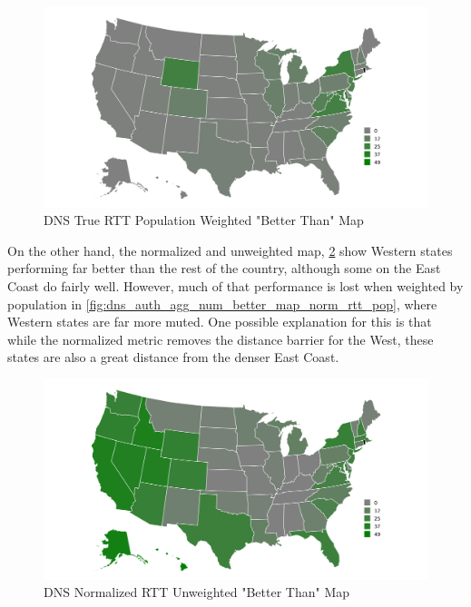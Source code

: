 \begin{figure}
    \centering
    \includegraphics{images/dns/analysis_auth_agg/rtt/population/num_better_than_map_rtt_pop.png}
    \caption{DNS True RTT Population Weighted "Better Than" Map}
    \label{fig:dns_auth_agg_num_better_map_rtt_pop}
\end{figure}

On the other hand, the normalized and unweighted map, \cref{fig:dns_auth_agg_num_better_map_norm_rtt_un} show Western states performing far better than the rest of the country, although some on the East Coast do fairly well. However, much of that performance is lost when weighted by population in \cref{fig:dns_auth_agg_num_better_map_norm_rtt_pop}, where Western states are far more muted. One possible explanation for this is that while the normalized metric removes the distance barrier for the West, these states are also a great distance from the denser East Coast.

\begin{figure}
    \centering
    \includegraphics{images/dns/analysis_auth_agg/rtt_normalized/unweighted/num_better_than_map_norm_rtt_un.png}
    \caption{DNS Normalized RTT Unweighted "Better Than" Map}
    \label{fig:dns_auth_agg_num_better_map_norm_rtt_un}
\end{figure}

